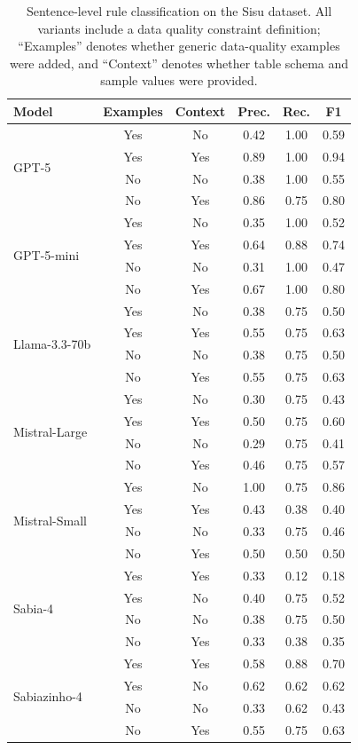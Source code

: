 \begin{table}[htbp]
\centering
\small
\caption{Sentence-level rule classification on the Sisu dataset. All variants include a data quality constraint definition; ``Examples'' denotes whether generic data-quality examples were added, and ``Context'' denotes whether table schema and sample values were provided.}
\label{tab:classification_results_sisu}
\begin{tabular}{@{}lccccc@{}}
\toprule
\textbf{Model} & \textbf{Examples} & \textbf{Context} & \textbf{Prec.} & \textbf{Rec.} & \textbf{F1} \\
\midrule
\multirow{4}{*}{GPT-5} & Yes & No & 0.42 & 1.00 & 0.59 \\
 & Yes & Yes & 0.89 & 1.00 & 0.94 \\
 & No & No & 0.38 & 1.00 & 0.55 \\
 & No & Yes & 0.86 & 0.75 & 0.80 \\
\cmidrule(lr){1-6}
\multirow{4}{*}{GPT-5-mini} & Yes & No & 0.35 & 1.00 & 0.52 \\
 & Yes & Yes & 0.64 & 0.88 & 0.74 \\
 & No & No & 0.31 & 1.00 & 0.47 \\
 & No & Yes & 0.67 & 1.00 & 0.80 \\
\cmidrule(lr){1-6}
\multirow{4}{*}{Llama-3.3-70b} & Yes & No & 0.38 & 0.75 & 0.50 \\
 & Yes & Yes & 0.55 & 0.75 & 0.63 \\
 & No & No & 0.38 & 0.75 & 0.50 \\
 & No & Yes & 0.55 & 0.75 & 0.63 \\
\cmidrule(lr){1-6}
\multirow{4}{*}{Mistral-Large} & Yes & No & 0.30 & 0.75 & 0.43 \\
 & Yes & Yes & 0.50 & 0.75 & 0.60 \\
 & No & No & 0.29 & 0.75 & 0.41 \\
 & No & Yes & 0.46 & 0.75 & 0.57 \\
\cmidrule(lr){1-6}
\multirow{4}{*}{Mistral-Small} & Yes & No & 1.00 & 0.75 & 0.86 \\
 & Yes & Yes & 0.43 & 0.38 & 0.40 \\
 & No & No & 0.33 & 0.75 & 0.46 \\
 & No & Yes & 0.50 & 0.50 & 0.50 \\
\cmidrule(lr){1-6}
\multirow{4}{*}{Sabia-4} & Yes & Yes & 0.33 & 0.12 & 0.18 \\
 & Yes & No & 0.40 & 0.75 & 0.52 \\
 & No & No & 0.38 & 0.75 & 0.50 \\
 & No & Yes & 0.33 & 0.38 & 0.35 \\
\cmidrule(lr){1-6}
\multirow{4}{*}{Sabiazinho-4} & Yes & Yes & 0.58 & 0.88 & 0.70 \\
 & Yes & No & 0.62 & 0.62 & 0.62 \\
 & No & No & 0.33 & 0.62 & 0.43 \\
 & No & Yes & 0.55 & 0.75 & 0.63 \\
\bottomrule
\end{tabular}
\end{table}